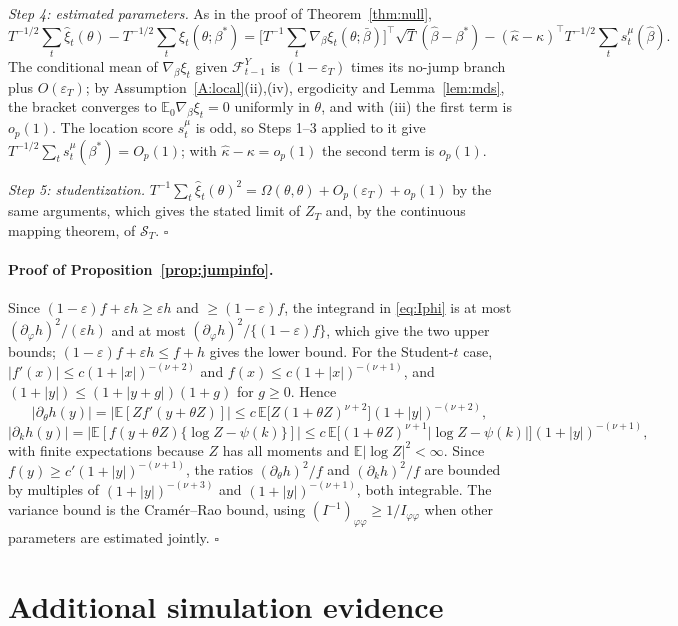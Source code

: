 \documentclass[11pt,a4paper]{article}
\theoremstyle{definition}
\theoremstyle{remark}
\newcommand{\E}{\mathbb{E}}
\newcommand{\F}{\mathcal{F}}
\newcommand{\tr}{^{\top}}
\begin{document}
\emph{Step 4: estimated parameters.} As in the proof of Theorem~\ref{thm:null},
\[
T^{-1/2}\sum_t\hat\xi_t(\theta)-T^{-1/2}\sum_t\xi_t(\theta;\beta^*)=\Big[T^{-1}\sum_t\nabla_\beta\xi_t(\theta;\bar\beta)\Big]\tr\sqrt T(\hat\beta-\beta^*)-(\hat\kappa-\kappa)\tr T^{-1/2}\sum_ts^\mu_t(\hat\beta).
\]
The conditional mean of $\nabla_\beta\xi_t$ given $\F^Y_{t-1}$ is $(1-\varepsilon_T)$ times its no-jump branch plus $O(\varepsilon_T)$; by Assumption~\ref{A:local}(ii),(iv), ergodicity and Lemma~\ref{lem:mds}, the bracket converges to $\E_0\nabla_\beta\xi_t=0$ uniformly in $\theta$, and with (iii) the first term is $o_p(1)$. The location score $s^\mu_t$ is odd, so Steps 1--3 applied to it give $T^{-1/2}\sum_ts^\mu_t(\beta^*)=O_p(1)$; with $\hat\kappa-\kappa=o_p(1)$ the second term is $o_p(1)$.

\emph{Step 5: studentization.} $T^{-1}\sum_t\hat\xi_t(\theta)^2=\Omega(\theta,\theta)+O_p(\varepsilon_T)+o_p(1)$ by the same arguments, which gives the stated limit of $Z_T$ and, by the continuous mapping theorem, of $\mathcal S_T$.
\hfill$\square$

\paragraph{Proof of Proposition~\ref{prop:jumpinfo}.}

Since $(1-\varepsilon)f+\varepsilon h\ge\varepsilon h$ and $\ge(1-\varepsilon)f$, the integrand in \eqref{eq:Iphi} is at most $(\partial_\varphi h)^2/(\varepsilon h)$ and at most $(\partial_\varphi h)^2/\{(1-\varepsilon)f\}$, which give the two upper bounds; $(1-\varepsilon)f+\varepsilon h\le f+h$ gives the lower bound. For the Student-$t$ case, $|f'(x)|\le c(1+|x|)^{-(\nu+2)}$ and $f(x)\le c(1+|x|)^{-(\nu+1)}$, and $(1+|y|)\le(1+|y+g|)(1+g)$ for $g\ge0$. Hence
\[
|\partial_\theta h(y)|=\big|\E[Zf'(y+\theta Z)]\big|\le c\,\E\big[Z(1+\theta Z)^{\nu+2}\big](1+|y|)^{-(\nu+2)},
\]
\[
|\partial_kh(y)|=\big|\E[f(y+\theta Z)\{\log Z-\psi(k)\}]\big|\le c\,\E\big[(1+\theta Z)^{\nu+1}|\log Z-\psi(k)|\big](1+|y|)^{-(\nu+1)},
\]
with finite expectations because $Z$ has all moments and $\E|\log Z|^2<\infty$. Since $f(y)\ge c'(1+|y|)^{-(\nu+1)}$, the ratios $(\partial_\theta h)^2/f$ and $(\partial_kh)^2/f$ are bounded by multiples of $(1+|y|)^{-(\nu+3)}$ and $(1+|y|)^{-(\nu+1)}$, both integrable. The variance bound is the Cram\'er--Rao bound, using $(I^{-1})_{\varphi\varphi}\ge1/I_{\varphi\varphi}$ when other parameters are estimated jointly.
\hfill$\square$

\section{Additional simulation evidence}\label{app:extra}
\end{document}
